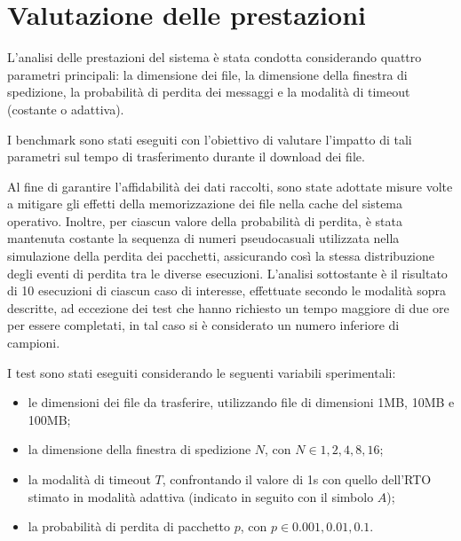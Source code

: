 \documentclass[12pt]{article}
\begin{document}
\section{Valutazione delle prestazioni} {



L'analisi delle prestazioni del sistema è stata condotta considerando quattro parametri principali: la dimensione dei file, la dimensione della finestra di spedizione, la probabilità di perdita dei messaggi e la modalità di timeout (costante o adattiva).

I benchmark sono stati eseguiti con l'obiettivo di valutare l'impatto di tali parametri sul tempo di trasferimento durante il download dei file.

Al fine di garantire l'affidabilità dei dati raccolti, sono state adottate misure volte a mitigare gli effetti della memorizzazione dei file nella cache del sistema operativo. Inoltre, per ciascun valore della probabilità di perdita, è stata mantenuta costante la sequenza di numeri pseudocasuali utilizzata nella simulazione della perdita dei pacchetti, assicurando così la stessa distribuzione degli eventi di perdita tra le diverse esecuzioni.
L'analisi sottostante è il risultato di 10 esecuzioni di ciascun caso di interesse, effettuate secondo le modalità sopra descritte, ad eccezione dei test che hanno richiesto un tempo maggiore di due ore per essere completati, in tal caso si è considerato un numero inferiore di campioni.

I test sono stati eseguiti considerando le seguenti variabili sperimentali:
\begin{itemize}
    \item le dimensioni dei file da trasferire, utilizzando file di dimensioni 1MB, 10MB e 100MB;
    \item la dimensione della finestra di spedizione $N$, con $N \in {1, 2, 4, 8, 16}$;
    \item la modalità di timeout $T$, confrontando il valore di 1s con quello dell'RTO stimato in modalità adattiva (indicato in seguito con il simbolo $A$);
    \item la probabilità di perdita di pacchetto $p$, con $p \in {0.001, 0.01, 0.1}$.
\end{itemize}

}
\end{document}
